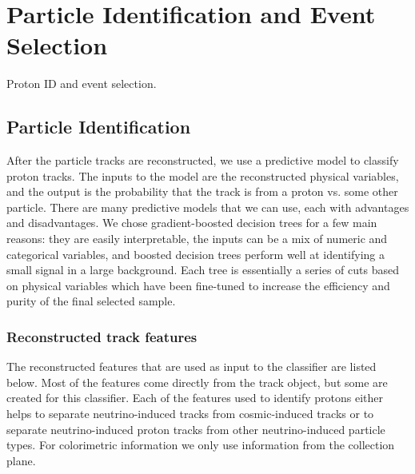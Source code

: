 \section{Particle Identification and Event Selection}\label{protonid}
\hspace{\parindent}
Proton ID and event selection.

\subsection{Particle Identification}
  After the particle tracks are reconstructed, we use a predictive model to
  classify proton tracks. The inputs to the model are the reconstructed
  physical variables, and the output is the probability that the track is from
  a proton vs. some other particle. There are many predictive models that we
  can use, each with advantages and disadvantages. We chose gradient-boosted
  decision trees for a few main reasons: they are easily interpretable, the
  inputs can be a mix of numeric and categorical variables, and boosted
  decision trees perform well at identifying a small signal in a large
  background.  Each tree is essentially a series of cuts based on physical
  variables which have been fine-tuned to increase the efficiency and purity of
  the final selected sample.
  \subsubsection{Reconstructed track features}\label{sec:features}
    The reconstructed features that are used as input to the classifier are
    listed below. Most of the features come directly from the track object, but
    some are created for this classifier. Each of the features used to identify
    protons either helps to separate neutrino-induced tracks from
    cosmic-induced tracks or to separate neutrino-induced proton tracks from
    other neutrino-induced particle types. For colorimetric information we only
    use information from the collection plane.

